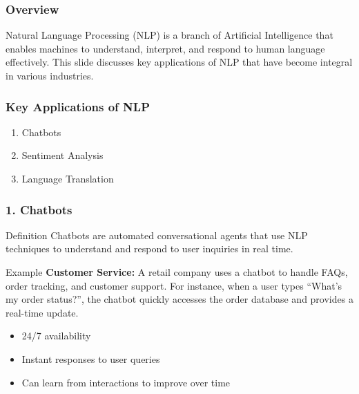 \documentclass[aspectratio=169]{beamer}
\begin{document}
\begin{frame}[fragile]
    \frametitle{Overview}
    Natural Language Processing (NLP) is a branch of Artificial Intelligence that enables machines to understand, interpret, and respond to human language effectively. This slide discusses key applications of NLP that have become integral in various industries.
\end{frame}

\begin{frame}[fragile]
    \frametitle{Key Applications of NLP}
    \begin{enumerate}
        \item Chatbots
        \item Sentiment Analysis
        \item Language Translation
    \end{enumerate}
\end{frame}

\begin{frame}[fragile]
    \frametitle{1. Chatbots}
    \begin{block}{Definition}
        Chatbots are automated conversational agents that use NLP techniques to understand and respond to user inquiries in real time.
    \end{block}
    \begin{block}{Example}
        \textbf{Customer Service:} A retail company uses a chatbot to handle FAQs, order tracking, and customer support. For instance, when a user types ``What’s my order status?'', the chatbot quickly accesses the order database and provides a real-time update.
    \end{block}
    
    \begin{itemize}
        \item 24/7 availability
        \item Instant responses to user queries
        \item Can learn from interactions to improve over time
    \end{itemize}
\end{frame}
\end{document}
